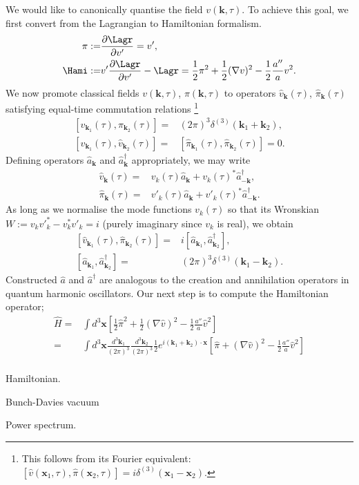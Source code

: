 We would like to canonically quantise the field $v(\mathbf{k},\tau)$. To achieve this goal, we first convert from the Lagrangian to Hamiltonian formalism.
\begin{align}
	\pi :=& \frac{\partial \Lagr}{\partial v'} = v', \\
	\Hami :=& v'\frac{\partial \Lagr}{\partial v'} - \Lagr = \frac{1}{2} \pi^2 + \frac{1}{2} (\nabla v)^2 - \frac{1}{2} \frac{a''}{a} v^2 .
\end{align}
We now promote classical fields $v(\mathbf{k},\tau)$, $\pi(\mathbf{k},\tau)$ to operators $\hat{v}_\mathbf{k}(\tau)$, $\hat{\pi}_\mathbf{k}(\tau)$ satisfying equal-time commutation relations \footnote{This follows from its Fourier equivalent: $[\hat{v}(\mathbf{x}_1,\tau),\hat{\pi}(\mathbf{x}_2,\tau)] = i\delta^{(3)}(\mathbf{x}_1 - \mathbf{x}_2)$.}
\begin{align}
	\left[ \hat{v}_{\mathbf{k}_1}(\tau), \hat{\pi}_{\mathbf{k}_2}(\tau) \right] =& (2\pi)^3 \delta^{(3)}(\mathbf{k}_1 + \mathbf{k}_2), \\
	\left[ \hat{v}_{\mathbf{k}_1}(\tau), \hat{v}_{\mathbf{k}_2}(\tau) \right] =& \left[ \hat{\pi}_{\mathbf{k}_1}(\tau), \hat{\pi}_{\mathbf{k}_2}(\tau) \right] = 0.
\end{align}
Defining operators $\hat{a}_\mathbf{k}$ and $\hat{a}_\mathbf{k}^\dagger$ appropriately, we may write
\begin{align}
	\hat{v}_\mathbf{k} (\tau) =& v_k(\tau) \hat{a}_\mathbf{k} + v_k(\tau)^* \hat{a}_{-\mathbf{k}}^\dagger,  \\
	\hat{\pi}_\mathbf{k} (\tau) =& {v'_k}(\tau) \hat{a}_\mathbf{k} + {v'_k}(\tau)^* \hat{a}_{-\mathbf{k}}^\dagger.
\end{align}
As long as we normalise the mode functions $v_k(\tau)$ so that its Wronskian $W := v_k v'^*_k - v_k^* v'_k = i$ (purely imaginary since $v_k$ is real), we obtain
\begin{align}
	\left[ \hat{v}_{\mathbf{k}_1}(\tau), \hat{\pi}_{\mathbf{k}_2}(\tau) \right] =& i \left[ \hat{a}_{\mathbf{k}_1}, \hat{a}^\dagger_{\mathbf{k}_2} \right], \\
	\left[ \hat{a}_{\mathbf{k}_1}, \hat{a}^\dagger_{\mathbf{k}_2} \right] =& (2\pi)^3 \delta^{(3)}(\mathbf{k}_1 - \mathbf{k}_2).	
\end{align}
Constructed $\hat{a}$ and $\hat{a}^\dagger$ are analogous to the creation and annihilation operators in quantum harmonic oscillators. Our next step is to compute the Hamiltonian operator;
\begin{align}
	\hat{H} =& \int d^3 \mathbf{x} \left[ \frac{1}{2} \hat{\pi}^2 + \frac{1}{2} \left( \nabla \hat{v} \right)^2 - \frac{1}{2}\frac{a''}{a} \hat{v}^2 \right] \\
	=& \int d^3 \mathbf{x} \frac{d^3 \mathbf{k}_1}{(2\pi)^3} \frac{d^3 \mathbf{k}_2}{(2\pi)^3} \frac{1}{2} e^{i(\mathbf{k}_1 + \mathbf{k}_2) \cdot \mathbf{x}}  \left[ \hat{\pi} + \left( \nabla \hat{v} \right)^2 - \frac{1}{2}\frac{a''}{a} \hat{v}^2 \right] \\
\end{align}


Hamiltonian.

Bunch-Davies vacuum

Power spectrum.

